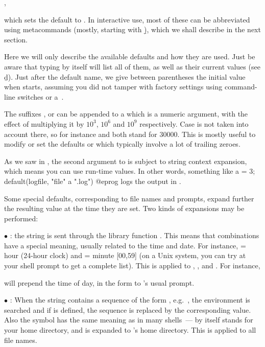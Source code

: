 ,

\noindent which sets the default  to . In interactive
use, most of these can be abbreviated using  metacommands
(mostly, starting with \b), which we shall describe in the next section.

Here we will only describe the available defaults and how they are used. Just
be aware that typing  by itself will list all of them, as well
as their current values (see \b{d}). Just after the default name, we give
between parentheses the initial value when  starts, assuming you did
not tamper with factory settings using command-line switches or a~.

 The suffixes ,  or  can be appended to
a  which is a numeric argument, with the effect of multiplying it
by $10^3$, $10^6$ and $10^9$ respectively. Case is not taken into account
there, so for instance  and  both stand for $30000$. This
is mostly useful to modify or set the defaults  or
 which typically involve a lot of trailing zeroes.

 As we saw in ,
the second argument to  is subject to string context
expansion, which means you can use run-time values. In other words, something
like
\bprog
  a = 3;
  default(logfile, "file" a ".log")
@eprog
logs the output in .

Some special defaults, corresponding to file names and prompts, expand further
the resulting value at the time they are set. Two kinds of expansions may be
performed:

$\bullet$ : the string is sent through the library
function . This means that \kbd{\%} combinations have
a special meaning, usually related to the time and date. For instance,
 = hour (24-hour clock) and  = minute [00,59] (on a Unix
system, you can try  at your shell prompt to get a complete
list). This is applied to , , and . For
instance,


\noindent
will prepend the time of day, in the form 
to 's usual prompt.

$\bullet$ : When the string contains a sequence of
the form , e.g.~, the environment is
searched and if  is defined, the sequence is replaced by the
corresponding value. Also the \kbd{\til} symbol has the same meaning as in
many shells~--- \kbd{\til} by itself stands for your home directory, and
 is expanded to 's home directory. This is applied
to all file names. \label{se:envir}

